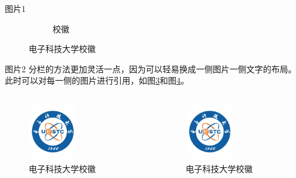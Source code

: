 \documentclass[aspectratio=169]{beamer}
\begin{document}
\begin{frame}{图片1}
\begin{figure}
\begin{subfigure}{0.3\textwidth}
            \caption{校徽}
            \label{fig:subfig3}
        \end{subfigure}
        \vspace{-1em}
        \caption{电子科技大学校徽}
        \label{fig:subfig}
    \end{figure}
\end{frame}

\begin{frame}{图片2}
    分栏的方法更加灵活一点，因为可以轻易换成一侧图片一侧文字的布局。\\
    此时可以对每一侧的图片进行引用，如图\ref{fig:columnleft}和图\ref{fig:columnright}。
    \begin{columns}[t]  %
        \begin{column}{0.5\textwidth}
            \begin{figure}
                \centering
                \includegraphics[width=0.5\textwidth]{logo.pdf}
                \caption{电子科技大学校徽}
                \label{fig:columnleft}
            \end{figure}
        \end{column}
        \begin{column}{0.5\textwidth}
            \begin{figure}
                \centering
                \includegraphics[width=0.5\textwidth]{logo.pdf}
                \caption{电子科技大学校徽}
                \label{fig:columnright}
            \end{figure}
        \end{column}
    \end{columns}
\end{frame}
\end{document}
